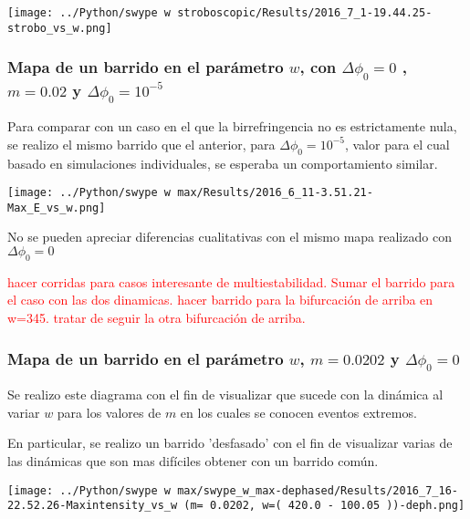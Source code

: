 		\begin{center}
			\texttt{[image: ../Python/swype w stroboscopic/Results/2016\_7\_1-19.44.25-strobo\_vs\_w.png]}
		\end{center}
		
		
	\subsubsection{Mapa de un barrido en el parámetro $w$, con $\Delta \phi_0 =0 $ , $m=0.02$ y $\Delta \phi_0=10^{-5}$}
			
			Para comparar con un caso en el que la birrefringencia no es estrictamente nula, se realizo el mismo barrido que el anterior, para $\Delta \phi_0 =10^{-5} $, valor para el cual basado en simulaciones individuales, se esperaba un comportamiento similar.
			
					
			\begin{center}
				\texttt{[image: ../Python/swype w max/Results/2016\_6\_11-3.51.21-Max\_E\_vs\_w.png]}
			\end{center}
		
			No se pueden apreciar diferencias cualitativas con el mismo mapa realizado con $\Delta \phi_0=0$
			
		
		\textcolor{red}{hacer corridas para casos interesante de multiestabilidad. Sumar el barrido para el caso con las dos dinamicas. hacer barrido para la bifurcación de arriba en w=345. tratar de seguir la otra bifurcación de arriba.}			 
		
		
	
	\subsubsection{Mapa de un barrido en el parámetro $w$, $m=0.0202$ y $\Delta \phi_0=0$}			 			
	Se realizo este diagrama con el fin de visualizar que sucede con la dinámica al variar $w$ para los valores de $m$ en los cuales se conocen eventos extremos.
	
	En particular, se realizo un barrido 'desfasado'  con el fin de visualizar varias de las dinámicas que son mas difíciles obtener con un barrido común.
	
	\begin{minipage}{0.7\textwidth}
		\centering
		\texttt{[image: ../Python/swype w max/swype\_w\_max-dephased/Results/2016\_7\_16-22.52.26-Maxintensity\_vs\_w (m= 0.0202, w=( 420.0 - 100.05 ))-deph.png]}
	\end{minipage}	
	
